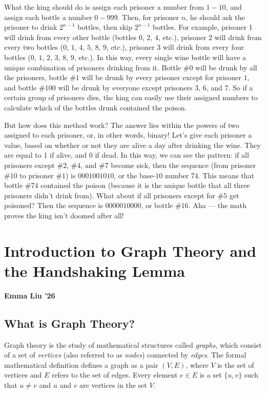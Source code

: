 \documentclass{article}
\begin{document}
\begin{multicols}{2}
What the king should do is assign each prisoner a number from $1-10$, and assign each bottle a number $0-999$. Then, for prisoner $n$, he should ask the prisoner to drink $2^{n-1}$ bottles, then skip $2^{n-1}$ bottles. For example, prisoner 1 will drink from every other bottle (bottles $0$, $2$, $4$, etc.), prisoner 2 will drink from every two bottles ($0$, $1$, $4$, $5$, $8$, $9$, etc.), prisoner 3 will drink from every four bottles ($0$, $1$, $2$, $3$, $8$, $9$, etc.). In this way, every single wine bottle will have a unique combination of prisoners drinking from it. Bottle $\#0$ will be drunk by all the prisoners, bottle $\#1$ will be drunk by every prisoner except for prisoner $1$, and bottle $\#100$ will be drunk by everyone except prisoners $3$, $6$, and $7$. So if a certain group of prisoners dies, the king can easily use their assigned numbers to calculate which of the bottles drunk contained the poison.

But how does this method work? The answer lies within the powers of two assigned to each prisoner, or, in other words, binary! Let’s give each prisoner a value, based on whether or not they are alive a day after drinking the wine. They are equal to 1 if alive, and $0$ if dead. In this way, we can see the pattern: if all prisoners except $\#2$, $\#4$, and $\#7$ become sick, then the sequence (from prisoner $\#10$ to prisoner $\#1$) is $0001001010$, or the base-$10$ number $74$. This means that bottle $\#74$ contained the poison (because it is the unique bottle that all three prisoners didn’t drink from). What about if all prisoners except for $\#5$ get poisoned? Then the sequence is $0000010000$, or bottle $\#16$. Aha — the math proves the king isn’t doomed after all!

\section*{Introduction to Graph Theory and the Handshaking Lemma}
\noindent\textbf{Emma Liu '26}

\subsection*{What is Graph Theory?}
Graph theory is the study of mathematical structures called \textit{graphs}, which consist of a set of \textit{vertices} (also referred to as \textit{nodes}) connected by \textit{edges}. The formal mathematical definition defines a graph as a pair $(V, E)$, where $V$ is the set of vertices and $E$ refers to the set of edges. Every element $e\in E$ is a set $\{u, v\}$ such that $u\neq v$ and $u$ and $v$ are vertices in the set $V$. 


\end{multicols}
\end{document}
